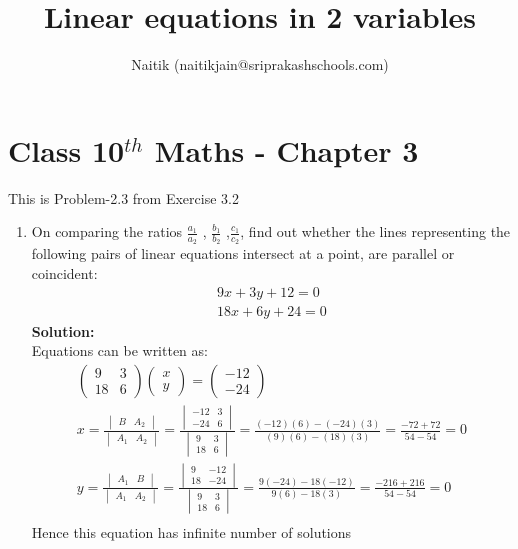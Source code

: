 \documentclass[10pt]{article}
\title{Linear equations in 2 variables}
\author{Naitik (naitikjain@sriprakashschools.com)}
\newcommand{\myvec}[1]{\ensuremath{\begin{pmatrix}#1\end{pmatrix}}}
\newcommand{\mydet}[1]{\ensuremath{\begin{vmatrix}#1\end{vmatrix}}}
\newcommand{\solution}{\noindent \textbf{Solution: }}
\begin{document}
\maketitle
\section*{Class 10$^{th}$ Maths - Chapter 3}
This is Problem-2.3 from Exercise 3.2
\begin{enumerate}
\item On comparing the ratios $\frac{a_1}{a_2}$ , $\frac{b_1}{b_2}$ ,$\frac{c_1}{c_2}$, find out whether the lines representing the following pairs of linear equations intersect at a point, are parallel or coincident:\\
\begin{align}
9x+3y+12=0\\
18x+6y+24=0
\end{align}
\solution \\
Equations can be written as:\\
\begin{align}
\myvec{9&3\\18&6} \myvec{x\\y}= \myvec{-12\\-24}\\
 x= \frac{{\mydet{B & A_2}}}{\mydet{A_1 & A_2}}
=\frac{\mydet{-12&3\\-24&6}}{\mydet{9&3\\18&6}}
=\frac{{(-12)(6) - (-24)(3)}}{{(9)(6) - (18)(3)}}
=\frac{-72+72}{54-54}
=0\\ 
 y= \frac{{\mydet{A_1 & B}}}{\mydet{A_1 & A_2}}
=\frac{\mydet{9&-12\\18&-24}}{\mydet{9&3\\18&6}}
=\frac{9(-24) - 18(-12)}{9(6) -18 (3)}
=\frac{-216+216}{54-54}
=0\\
\end{align}
Hence this equation has infinite number of solutions
\end{enumerate}
\end{document}
